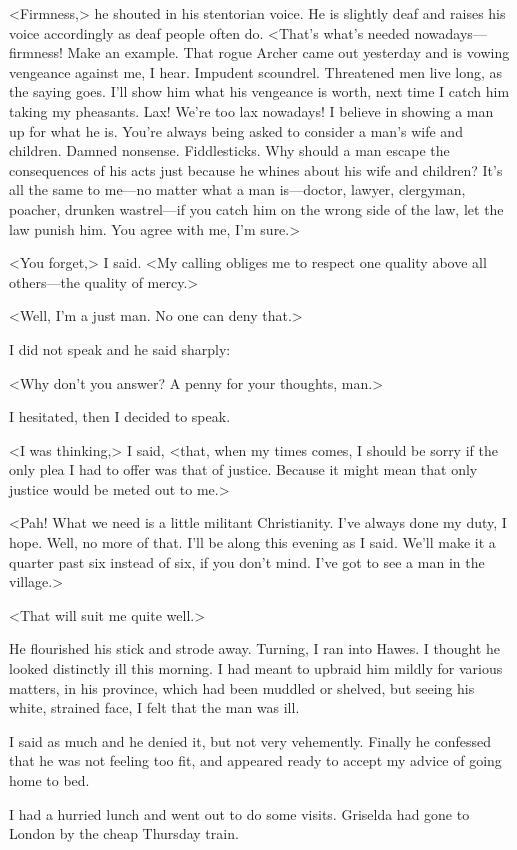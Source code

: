 <Firmness,> he shouted in his stentorian voice. He is slightly deaf and raises his voice accordingly as deaf people often do. <That's what's needed nowadays—firmness! Make an example. That rogue Archer came out yesterday and is vowing vengeance against me, I hear. Impudent scoundrel. Threatened men live long, as the saying goes. I'll show him what his vengeance is worth, next time I catch him taking my pheasants. Lax! We're too lax nowadays! I believe in showing a man up for what he is. You're always being asked to consider a man's wife and children. Damned nonsense. Fiddlesticks. Why should a man escape the consequences of his acts just because he whines about his wife and children? It's all the same to me—no matter what a man is—doctor, lawyer, clergyman, poacher, drunken wastrel—if you catch him on the wrong side of the law, let the law punish him. You agree with me, I'm sure.>

<You forget,> I said. <My calling obliges me to respect one quality above all others—the quality of mercy.>

<Well, I'm a just man. No one can deny that.>

I did not speak and he said sharply:

<Why don't you answer? A penny for your thoughts, man.>

I hesitated, then I decided to speak.

<I was thinking,> I said, <that, when my times comes, I should be sorry if the only plea I had to offer was that of justice. Because it might mean that only justice would be meted out to me.>

<Pah! What we need is a little militant Christianity. I've always done my duty, I hope. Well, no more of that. I'll be along this evening as I said. We'll make it a quarter past six instead of six, if you don't mind. I've got to see a man in the village.>

<That will suit me quite well.>

He flourished his stick and strode away. Turning, I ran into Hawes. I thought he looked distinctly ill this morning. I had meant to upbraid him mildly for various matters, in his province, which had been muddled or shelved, but seeing his white, strained face, I felt that the man was ill.

I said as much and he denied it, but not very vehemently. Finally he confessed that he was not feeling too fit, and appeared ready to accept my advice of going home to bed.

I had a hurried lunch and went out to do some visits. Griselda had gone to London by the cheap Thursday train.

